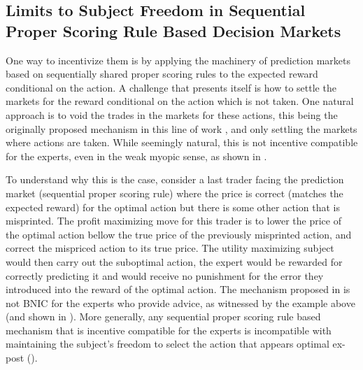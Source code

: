 \subsection{Limits to Subject Freedom in Sequential Proper Scoring Rule Based Decision Markets}

One way to incentivize them is by applying the machinery of prediction markets based on sequentially shared proper scoring rules to the expected reward conditional on the action.
A challenge that presents itself is how to settle the markets for the reward conditional on the action which is not taken.
One natural approach is to void the trades in the markets for these actions, this being the originally proposed mechanism in this line of work \cite{hanson2002decision}, and only settling the markets where actions are taken.
While seemingly natural, this is not incentive compatible for the experts, even in the weak myopic sense, as shown in \cite{othman2010decision}. 

To understand why this is the case, consider a last trader facing the prediction market (sequential proper scoring rule)  where the  price is correct (matches the expected reward) for the optimal action but there is some other action that is misprinted. The profit maximizing move for this trader is to lower the price of the optimal action bellow the true price of the previously misprinted action, and correct the mispriced action to its true  price. 
The utility maximizing subject would then carry out the suboptimal action, the expert would be rewarded for correctly predicting it and would receive no punishment for the error they introduced into the reward of the optimal action. 
The mechanism proposed in \cite{hanson2002decision} is not BNIC for the experts who provide advice, as witnessed by the example above (and shown in \cite{othman2010decision,chen2014eliciting}).
More generally, any sequential proper scoring rule based mechanism that is incentive compatible for the experts is incompatible with maintaining the subject's freedom to select the action that appears optimal ex-post (\cite{ chen2014eliciting}). 



